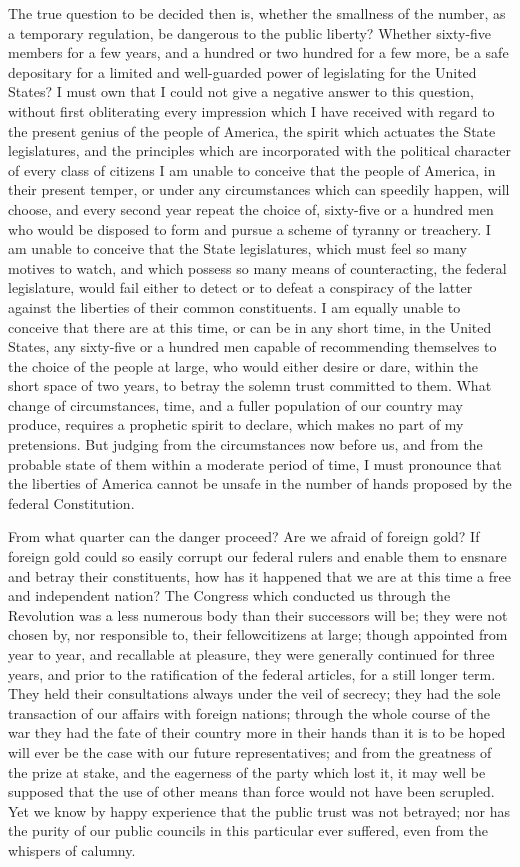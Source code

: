 The true question to be decided then is, whether the smallness of the number, as a temporary regulation, be dangerous to the public liberty? Whether sixty-five members for a few years, and a hundred or two hundred for a few more, be a safe depositary for a limited and well-guarded power of legislating for the United States? I must own that I could not give a negative answer to this question, without first obliterating every impression which I have received with regard to the present genius of the people of America, the spirit which actuates the State legislatures, and the principles which are incorporated with the political character of every class of citizens I am unable to conceive that the people of America, in their present temper, or under any circumstances which can speedily happen, will choose, and every second year repeat the choice of, sixty-five or a hundred men who would be disposed to form and pursue a scheme of tyranny or treachery. I am unable to conceive that the State legislatures, which must feel so many motives to watch, and which possess so many means of counteracting, the federal legislature, would fail either to detect or to defeat a conspiracy of the latter against the liberties of their common constituents. I am equally unable to conceive that there are at this time, or can be in any short time, in the United States, any sixty-five or a hundred men capable of recommending themselves to the choice of the people at large, who would either desire or dare, within the short space of two years, to betray the solemn trust committed to them. What change of circumstances, time, and a fuller population of our country may produce, requires a prophetic spirit to declare, which makes no part of my pretensions. But judging from the circumstances now before us, and from the probable state of them within a moderate period of time, I must pronounce that the liberties of America cannot be unsafe in the number of hands proposed by the federal Constitution.

From what quarter can the danger proceed? Are we afraid of foreign gold? If foreign gold could so easily corrupt our federal rulers and enable them to ensnare and betray their constituents, how has it happened that we are at this time a free and independent nation? The Congress which conducted us through the Revolution was a less numerous body than their successors will be; they were not chosen by, nor responsible to, their fellowcitizens at large; though appointed from year to year, and recallable at pleasure, they were generally continued for three years, and prior to the ratification of the federal articles, for a still longer term. They held their consultations always under the veil of secrecy; they had the sole transaction of our affairs with foreign nations; through the whole course of the war they had the fate of their country more in their hands than it is to be hoped will ever be the case with our future representatives; and from the greatness of the prize at stake, and the eagerness of the party which lost it, it may well be supposed that the use of other means than force would not have been scrupled. Yet we know by happy experience that the public trust was not betrayed; nor has the purity of our public councils in this particular ever suffered, even from the whispers of calumny.

